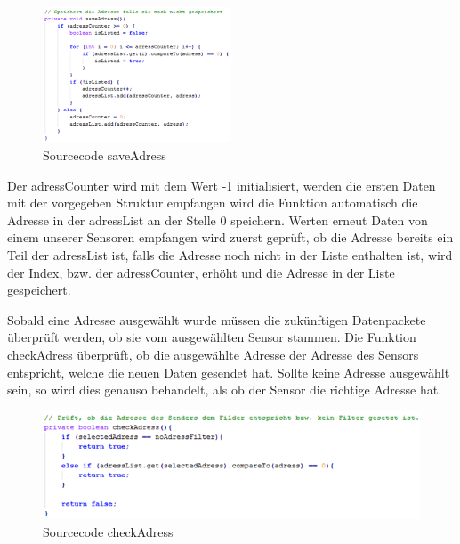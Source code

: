 \begin{figure}[ht]
    \includegraphics[width=0.5\textwidth]{3Vorgehen/imag/app_saveAdress.png}
    \caption{Sourcecode saveAdress}
	\label{app_saveAdress} 
\end{figure}

Der adressCounter wird mit dem Wert -1 initialisiert, werden die ersten Daten mit der vorgegeben Struktur empfangen wird die Funktion automatisch die Adresse in der adressList an der Stelle 0 speichern. Werten erneut Daten von einem unserer Sensoren empfangen wird zuerst geprüft, ob die Adresse bereits ein Teil der adressList ist, falls die Adresse noch nicht in der Liste enthalten ist, wird der Index, bzw. der adressCounter, erhöht und die Adresse in der Liste gespeichert.

Sobald eine Adresse ausgewählt wurde müssen die zukünftigen Datenpackete überprüft werden, ob sie vom ausgewählten Sensor stammen. Die Funktion checkAdress überprüft, ob die ausgewählte Adresse der Adresse des Sensors entspricht, welche die neuen Daten gesendet hat. Sollte keine Adresse ausgewählt sein, so wird dies genauso behandelt, als ob der Sensor die richtige Adresse hat.

\begin{figure}[ht]
    \includegraphics[width=1.0\textwidth]{3Vorgehen/imag/app_checkAdress.png}
    \caption{Sourcecode checkAdress}
	\label{app_checkAdress} 
\end{figure}

